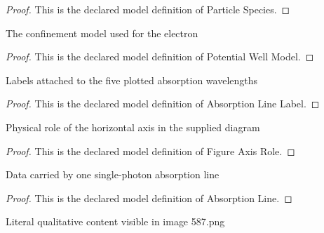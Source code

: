 \begin{proof}
  This is the declared model definition of Particle Species.
\end{proof}
\begin{definition}
  \label{def:physics:phyx-mini-0587:phyxminiproblems-problemphyxmini0587-potentialwellmodel}
  The confinement model used for the electron
\end{definition}
\begin{proof}
  This is the declared model definition of Potential Well Model.
\end{proof}
\begin{definition}
  \label{def:physics:phyx-mini-0587:phyxminiproblems-problemphyxmini0587-absorptionlinelabel}
  Labels attached to the five plotted absorption wavelengths
\end{definition}
\begin{proof}
  This is the declared model definition of Absorption Line Label.
\end{proof}
\begin{definition}
  \label{def:physics:phyx-mini-0587:phyxminiproblems-problemphyxmini0587-figureaxisrole}
  Physical role of the horizontal axis in the supplied diagram
\end{definition}
\begin{proof}
  This is the declared model definition of Figure Axis Role.
\end{proof}
\begin{definition}
  \label{def:physics:phyx-mini-0587:phyxminiproblems-problemphyxmini0587-absorptionline}
  Data carried by one single-photon absorption line
\end{definition}
\begin{proof}
  This is the declared model definition of Absorption Line.
\end{proof}
\begin{definition}
  \label{def:physics:phyx-mini-0587:phyxminiproblems-problemphyxmini0587-infinitewellabsorptionfigure}
  Literal qualitative content visible in image 587.png
\end{definition}
